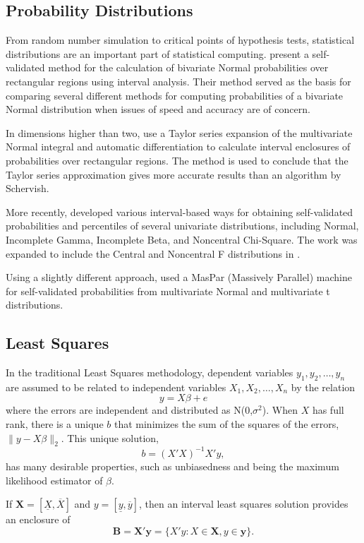 \subsection{Probability Distributions}

From random number simulation to critical points of hypothesis tests,
statistical distributions are an important part of statistical
computing. \cite{WK90a} present a self-validated method for the calculation of
bivariate Normal probabilities over rectangular regions using interval
analysis. Their method served as the basis for comparing several different
methods for computing probabilities of a bivariate Normal distribution when
issues of speed and accuracy are of concern.  

In dimensions higher than two, \cite{WK92a} use a Taylor series expansion of
the multivariate Normal integral and automatic differentiation to calculate
interval enclosures of probabilities over rectangular regions. The method is
used to conclude that the Taylor series approximation gives more accurate
results than an algorithm by Schervish. 

More recently, \cite{WK94} developed various interval-based ways for  
obtaining self-validated probabilities and percentiles of several univariate
distributions,  
including Normal, Incomplete Gamma, Incomplete Beta, and Noncentral Chi-Square. 
The work was expanded to include the Central and Noncentral F distributions in 
\cite{WK95}.

Using a slightly different approach, \cite{WangO94} used a MasPar (Massively Parallel) 
machine for self-validated probabilities from multivariate Normal and multivariate t 
distributions. 

\subsection{Least Squares }

In the traditional Least Squares methodology, dependent variables 
$y_1, y_2, \ldots, y_n$ are
assumed to be related to independent variables $X_1, X_2, \ldots, X_n$ by 
the relation
$$
y = X\beta + e
$$ 
where the errors are independent and distributed as N(0,$\sigma^2$). 
When $X$ has full rank, 
there is a unique $b$ that minimizes the sum of the squares of the errors, 
$\|y-X\beta\|_2$.  
This unique solution, 
$$
b = (X' X)^{-1}X'y,
$$
has many desirable properties, such as unbiasedness and being the maximum likelihood 
estimator of $\beta$.

If $\mathbf{X} = [\underline{X},\overline{X}]$ and $y = [\underline{y},
\overline{y}]$, 
then an interval least squares solution provides an 
enclosure of 
$$
\mathbf{B} = \mathbf{X}'\mathbf{y} = \{X'y: X\in \mathbf{X}, y\in\mathbf{y}\}.
$$

